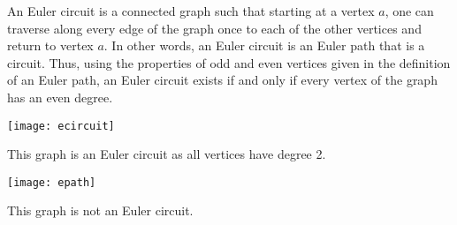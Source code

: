 \documentclass{article}
\begin{document}
An Euler circuit is a connected graph such that starting at a vertex $a$, one can traverse along every edge of the graph once to each of the other vertices and return to vertex $a$. In other words, an Euler circuit is an Euler path that is a circuit. Thus, using the properties of odd and even  vertices given in the definition of an Euler path, an Euler circuit exists if and only if every vertex of the graph has an even degree.

\begin{center}
  \texttt{[image: ecircuit]}
\end{center}

This graph is an Euler circuit as all vertices have degree 2.

\begin{center}
\texttt{[image: epath]}
\end{center}

This graph is not an Euler circuit.
\end{document}
